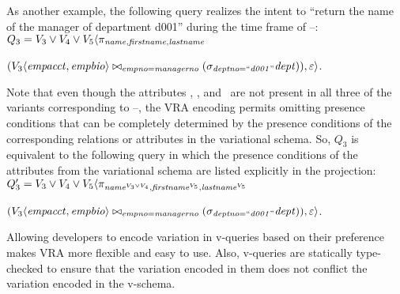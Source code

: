 As another example, the following query realizes the intent to ``return the
name of the manager of department d001'' during the time frame of
\vThree--\vFive:
%
\ensuremath{ Q_3 = \vThree\vee\vFour\vee\vFive \langle
  \pi_{\name,\fname,\lname} }
\centerline{
\ensuremath{  
(\joinRel{\chc[\vThree]{\empacct,\empbio}}{(\vSel[\deptno=\deptOne]{\dept})}
           {\empno=\managerno}),
  \empRel \rangle
  }.}
%
Note that even though the attributes \name, \fname, and \lname\ are not present
in all three of the variants corresponding to \vThree--\vFive, the VRA encoding
permits omitting presence conditions that can be completely determined by the
presence conditions of the corresponding relations or attributes in the
variational schema. So, $Q_3$ is equivalent to the following query in which the
presence conditions of the attributes from the variational schema are listed
explicitly in the projection:
%
\ensuremath{
Q_3' = \vThree\vee\vFour\vee\vFive \langle
  \pi_{\oatt{\name}{\vThree\vee\vFour},\oatt{\fname}{\vFive},\oatt{\lname}{\vFive}} }
\centerline{
\ensuremath{
  (\joinRel{\chc[\vThree]{\empacct,\empbio}}{(\vSel[\deptno=\deptOne]{\dept})}
           {\empno=\managerno}),
  \empRel \rangle}.}
%
%
Allowing developers to encode variation in v-queries based on their
preference makes VRA more flexible and easy to use. 
Also, v-queries are statically type-checked to ensure that
the variation encoded in them does not conflict the variation encoded
in the v-schema. 

% 


%
